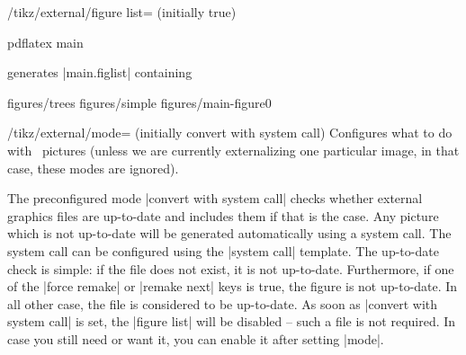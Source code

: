 {\begin{key}{/tikz/external/figure list= (initially true)}

\begin{codeexample}
pdflatex main
\end{codeexample}
generates |main.figlist| containing
\begin{codeexample}
figures/trees
figures/simple
figures/main-figure0
\end{codeexample}
\end{key}

\begin{key}{/tikz/external/mode= (initially convert with system call)}
	Configures what to do with \tikzname\ pictures (unless we are currently externalizing one particular image, in that case, these modes are ignored).

	The preconfigured mode |convert with system call| checks whether external graphics files are up-to-date and includes them if that is the case. Any picture which is not up-to-date will be generated automatically using a system call. The system call can be configured using the |system call| template. The up-to-date check is simple: if the file does not exist, it is not up-to-date. Furthermore, if one of the |force remake| or |remake next| keys is true, the figure is not up-to-date. In all other case, the file is considered to be up-to-date. As soon as |convert with system call| is set, the |figure list| will be disabled -- such a file is not required. In case you still need or want it, you can enable it after setting |mode|.


\end{key}}
